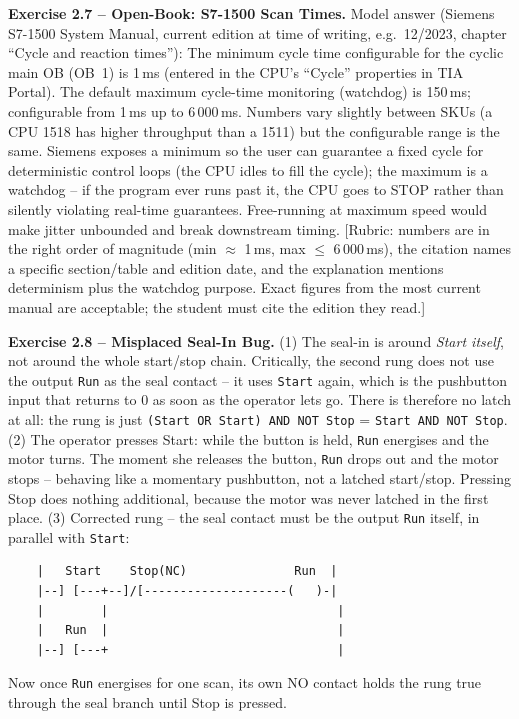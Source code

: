 \documentclass[11pt,a4paper]{article}
\begin{document}
\begin{solutionbox}
\textbf{Exercise 2.7 -- Open-Book: S7-1500 Scan Times.}
Model answer (Siemens S7-1500 System Manual, current edition at time of
writing, e.g.\ 12/2023, chapter ``Cycle and reaction times''):
The minimum cycle time configurable for the cyclic main OB
(OB~1) is 1\,ms (entered in the CPU's
``Cycle'' properties in TIA Portal). The default maximum cycle-time
monitoring (watchdog) is 150\,ms; configurable
from 1\,ms up to 6\,000\,ms.
Numbers vary slightly between SKUs (a CPU 1518 has higher throughput than
a 1511) but the configurable range is the same.
Siemens exposes a minimum so the user can guarantee a fixed cycle for
deterministic control loops (the CPU idles to fill the cycle); the
maximum is a watchdog -- if the program ever runs past it, the CPU goes
to STOP rather than silently violating real-time guarantees. Free-running
at maximum speed would make jitter unbounded and break downstream timing.
[Rubric: numbers are in the right order of magnitude (min $\approx$ 1\,ms,
max $\le$ 6\,000\,ms), the citation names a specific section/table and
edition date, and the explanation mentions determinism plus the watchdog
purpose. Exact figures from the most current manual are acceptable; the
student must cite the edition they read.]
\end{solutionbox}

\begin{solutionbox}
\textbf{Exercise 2.8 -- Misplaced Seal-In Bug.}
(1) The seal-in is around \emph{Start itself}, not around the whole
start/stop chain. Critically, the second rung does not use the output
\texttt{Run} as the seal contact -- it uses \texttt{Start} again, which
is the pushbutton input that returns to 0 as soon as the operator lets
go. There is therefore no latch at all: the rung is just
\texttt{(Start~OR~Start)~AND~NOT~Stop} = \texttt{Start~AND~NOT~Stop}.
(2) The operator presses Start: while the button is held, \texttt{Run}
energises and the motor turns. The moment she releases the button,
\texttt{Run} drops out and the motor stops -- behaving like a momentary
pushbutton, not a latched start/stop. Pressing Stop does nothing
additional, because the motor was never latched in the first place.
(3) Corrected rung -- the seal contact must be the output \texttt{Run}
itself, in parallel with \texttt{Start}:
\begin{verbatim}
    |   Start    Stop(NC)               Run  |
    |--] [---+--]/[--------------------(   )-|
    |        |                                |
    |   Run  |                                |
    |--] [---+                                |
\end{verbatim}
Now once \texttt{Run} energises for one scan, its own NO contact holds
the rung true through the seal branch until Stop is pressed.
\end{solutionbox}
\end{document}
